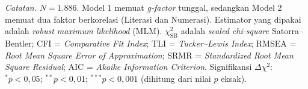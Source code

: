 \begin{table}[H]
    \centering
    \caption{Perbandingan Indeks Kecocokan Model 1 (\textit{g-factor} Tunggal) dan Model 2 (Dua Faktor Berkorelasi) pada CFA}
    \label{tab:cfa_fit}
    \begin{spacing}{1.0}
    \end{spacing}
    \vspace{2mm}
    \begin{flushleft}
    \footnotesize\textit{Catatan.} $N = 1.886$. Model 1 memuat \textit{g-factor} tunggal, sedangkan Model 2 memuat dua faktor berkorelasi (Literasi dan Numerasi). Estimator yang dipakai adalah \textit{robust maximum likelihood} (MLM). $\chi^2_{\text{SB}}$ adalah \textit{scaled chi-square} Satorra--Bentler; CFI = \textit{Comparative Fit Index}; TLI = \textit{Tucker--Lewis Index}; RMSEA = \textit{Root Mean Square Error of Approximation}; SRMR = \textit{Standardized Root Mean Square Residual}; AIC = \textit{Akaike Information Criterion}. Signifikansi $\Delta\chi^2$: $^{*}p < 0,05$; $^{**}p < 0,01$; $^{***}p < 0,001$ (dihitung dari nilai $p$ eksak).
    \end{flushleft}
\end{table}
